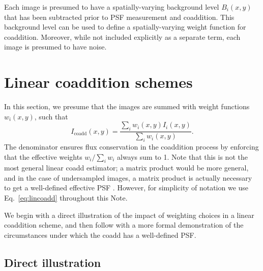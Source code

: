 \documentclass[modern]{style_and_logos/lsstdescnote}
\begin{document}
Each image is presumed to have a spatially-varying background level $B_i(x,y)$ that has been subtracted prior to PSF measurement and coaddition.  This background level can be used to define a spatially-varying weight function for coaddition.  Moreover, while not included explicitly as a separate term, each image is presumed to have noise.

\section{Linear coaddition schemes}\label{sec:lin}

In this section, we presume that the images are summed with weight functions $w_i(x,y)$, such that
\begin{equation}\label{eq:lincoadd}
    I_\text{coadd}(x,y) = \frac{\sum_i w_i(x,y) I_i(x,y)}{\sum_i w_i(x,y)}.
\end{equation}
The denominator ensures flux conservation in the coaddition process by enforcing that the effective weights $w_i/\sum_i w_i$ always sum to 1. Note that this is not the most general linear coadd estimator; a matrix product would be more general, and in the case of undersampled images, a matrix product is actually necessary to get a well-defined effective PSF \citep{2011ApJ...741...46R}.  However, for simplicity of notation we use Eq.~\eqref{eq:lincoadd} throughout this Note.

We begin with a direct illustration of the impact of weighting choices in a linear coaddition scheme, and then follow with a more formal demonstration of the circumstances under which the coadd has a well-defined PSF.

\subsection{Direct illustration}\label{subsec:direct}
\end{document}
